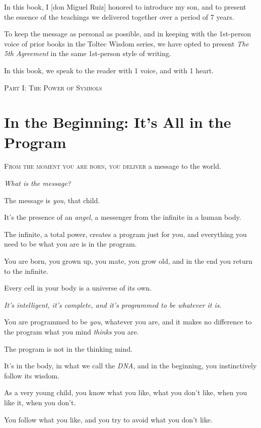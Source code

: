\documentclass{article}
\numberwithin{equation}{section}
\begin{document}
In this book, I [don Miguel Ruiz] honored to introduce my son, and to present the essence of the teachings we delivered together over a period of 7 years.

%
To keep the message as personal as possible, and in keeping with the 1st-person voice of prior books in the Toltec Wisdom series, we have opted to present  \textit{The 5th Agreement} in the same 1st-person style of writing.

In this book, we speak to the reader with 1 voice, and with 1 heart.


\begin{center}
    \huge\textsc{Part I: The Power of Symbols}
\end{center}

\section{In the Beginning: It's All in the Program}
\textsc{From the moment you are born, you deliver} a message to the world.

\textit{What is the message?}

The message is \textit{you}, that child.

It's the presence of an \textit{angel}, a messenger from the infinite in a human body.

The infinite, a total power, creates a program just for you, and everything you need to be what you are is in the program.

You are born, you grown up, you mate, you grow old, and in the end you return to the infinite.

Every cell in your body is a universe of its own.

\textit{It's intelligent, it's complete, and it's programmed to be whatever it is}.

%
You are programmed to be \textit{you}, whatever you are, and it makes no difference to the program what you mind \textit{thinks} you are.

The program is not in the thinking mind.

It's in the body, in what we call the \textit{DNA}, and in the beginning, you instinctively follow its wisdom.

As a very young child, you know what you like, what you don't like, when you like it, when you don't.

You follow what you like, and you try to avoid what you don't like.
\end{document}
